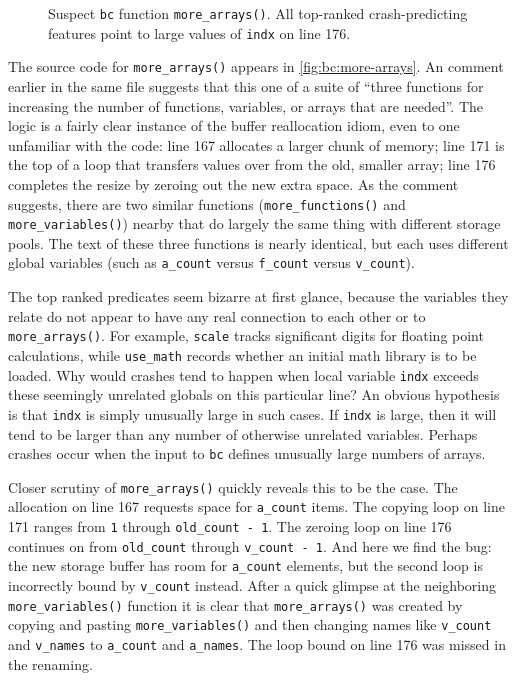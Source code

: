\begin{figure}
  \centering
  \caption{Suspect \texttt{bc} function \texttt{more\_arrays()}.  All
  top-ranked crash-predicting features point to large values of
  \texttt{indx} on line 176.}
  \label{fig:bc:more-arrays}
\end{figure}

The source code for \texttt{more\_arrays()} appears in
\autoref{fig:bc:more-arrays}.  An comment earlier in the same file
suggests that this one of a suite of ``three functions for increasing
the number of functions, variables, or arrays that are needed''.  The
logic is a fairly clear instance of the buffer reallocation idiom,
even to one unfamiliar with the code: line 167 allocates a larger
chunk of memory; line 171 is the top of a loop that transfers values
over from the old, smaller array; line 176 completes the resize by
zeroing out the new extra space.  As the comment suggests, there are
two similar functions (\texttt{more\_functions()} and
\texttt{more\_variables()}) nearby that do largely the same thing with
different storage pools.  The text of these three functions is nearly
identical, but each uses different global variables (such as
\texttt{a\_count} versus \texttt{f\_count} versus \texttt{v\_count}).

The top ranked predicates seem bizarre at first glance, because the
variables they relate do not appear to have any real connection to
each other or to \texttt{more\_arrays()}.  For example, \texttt{scale}
tracks significant digits for floating point calculations, while
\texttt{use\_math} records whether an initial math library is to be
loaded.  Why would crashes tend to happen when local variable
\texttt{indx} exceeds these seemingly unrelated globals on this
particular line?  An obvious hypothesis is that \texttt{indx} is
simply unusually large in such cases.  If \texttt{indx} is large, then
it will tend to be larger than any number of otherwise unrelated
variables.  Perhaps crashes occur when the input to \texttt{bc}
defines unusually large numbers of arrays.

Closer scrutiny of \texttt{more\_arrays()} quickly reveals this to be
the case.  The allocation on line 167 requests space for
\texttt{a\_count} items.  The copying loop on line 171 ranges from
\texttt{1} through \texttt{old\_count - 1}.  The zeroing loop on line
176 continues on from \texttt{old\_count} through \texttt{v\_count -
  1}.  And here we find the bug: the new storage buffer has room for
\texttt{a\_count} elements, but the second loop is incorrectly bound
by \texttt{v\_count} instead.  After a quick glimpse at the
neighboring \texttt{more\_variables()} function it is clear that
\texttt{more\_arrays()} was created by copying and pasting
\texttt{more\_variables()} and then changing names like
\texttt{v\_count} and \texttt{v\_names} to \texttt{a\_count} and
\texttt{a\_names}.  The loop bound on line 176 was missed in the
renaming.

